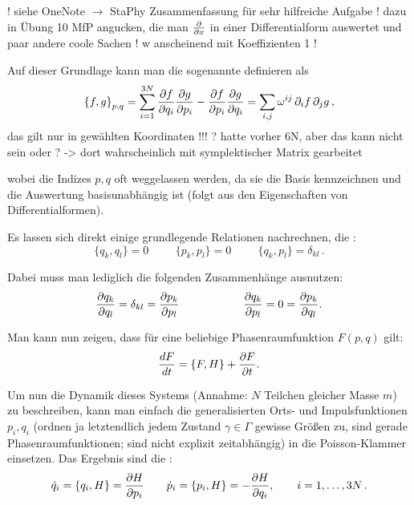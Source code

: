 \documentclass[../class_mech_main.tex]{subfiles}
\begin{document}
! siehe OneNote $\rightarrow$ StaPhy Zusammenfassung für sehr hilfreiche Aufgabe ! dazu in Übung 10 MfP angucken, die man $\pdv{x}$ in einer Differentialform auswertet und paar andere coole Sachen ! w anscheinend mit Koeffizienten 1 !

Auf dieser Grundlage kann man die sogenannte  definieren als
\begin{equation}
\qty{f,g}_{p,q} = \sum\limits_{i = 1}^{3N} \pdv{f}{q_i} \pdv{g}{p_i} - \pdv{f}{p_i} \pdv{g}{q_i} = \sum\limits_{i,j} \omega^{ij} \, \partial_i f \, \partial_j g \, ,
\end{equation}
das gilt nur in gewählten Koordinaten !!! ? hatte vorher 6N, aber das kann nicht sein oder ? -> dort wahrscheinlich mit symplektischer Matrix gearbeitet

wobei die Indizes $p,q$ oft weggelassen werden, da sie die Basis kennzeichnen und die Auswertung basisunabhängig ist (folgt aus den Eigenschaften von Differentialformen).

Es lassen sich direkt einige grundlegende Relationen nachrechnen, die :
\begin{equation}
\{q_k, q_l\} = 0 \hspace{1cm} \{p_k, p_l\} = 0 \hspace{1cm} \{q_k, p_l\} = \delta_{kl} \, .
\end{equation}

Dabei muss man lediglich die folgenden Zusammenhänge ausnutzen:
\begin{equation}
\pdv{q_k}{q_l} = \delta_{kl} = \pdv{p_k}{p_l} \hspace{2cm} \pdv{q_k}{p_l} = 0 = \pdv{p_k}{q_l} .
\end{equation}

Man kann nun zeigen, dass für eine beliebige Phasenraumfunktion $F(p,q)$ gilt:
\begin{equation}
\dv{F}{t} = \qty{F,H} + \pdv{F}{t} .
\end{equation}

Um nun die Dynamik dieses Systems (Annahme: $N$ Teilchen gleicher Masse $m$) zu beschreiben, kann man einfach die generalisierten Orts- und Impulsfunktionen $p_i, q_i$ (ordnen ja letztendlich jedem Zustand $\gamma \in \Gamma$ gewisse Größen zu, sind gerade Phasenraumfunktionen; sind nicht explizit zeitabhängig) in die Poisson-Klammer einsetzen. Das Ergebnis sind die :
\begin{equation}\label{eq:kanGl}
\dot{q}_i = \qty{q_i, H} = \pdv{H}{p_i} \qquad \dot{p}_i = \qty{p_i, H} = -\pdv{H}{q_i}, \qquad i = 1, \dots, 3N \, .
\end{equation}
\end{document}
